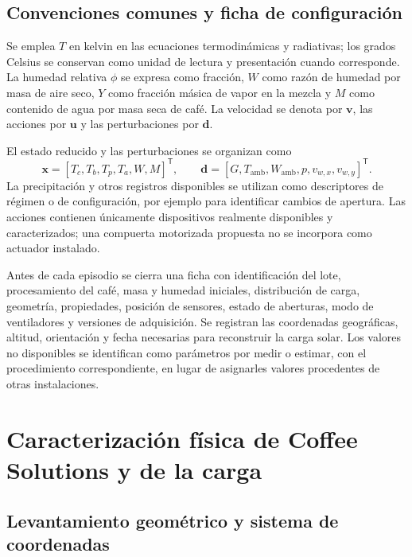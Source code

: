 \subsection{Convenciones comunes y ficha de configuración}

Se emplea $T$ en kelvin en las ecuaciones termodinámicas y radiativas; los grados Celsius se conservan como unidad de lectura y presentación cuando corresponde. La humedad relativa $\phi$ se expresa como fracción, $W$ como razón de humedad por masa de aire seco, $Y$ como fracción másica de vapor en la mezcla y $M$ como contenido de agua por masa seca de café. La velocidad se denota por $\mathbf v$, las acciones por $\mathbf u$ y las perturbaciones por $\mathbf d$.

El estado reducido y las perturbaciones se organizan como
\begin{equation}
\mathbf x=[T_c,T_b,T_p,T_a,W,M]^{\mathsf T},
\qquad
\mathbf d=[G,T_{\mathrm{amb}},W_{\mathrm{amb}},p,v_{w,x},v_{w,y}]^{\mathsf T}.
\label{met:estados_entradas}
\end{equation}
La precipitación y otros registros disponibles se utilizan como descriptores de régimen o de configuración, por ejemplo para identificar cambios de apertura. Las acciones contienen únicamente dispositivos realmente disponibles y caracterizados; una compuerta motorizada propuesta no se incorpora como actuador instalado.

Antes de cada episodio se cierra una ficha con identificación del lote, procesamiento del café, masa y humedad iniciales, distribución de carga, geometría, propiedades, posición de sensores, estado de aberturas, modo de ventiladores y versiones de adquisición. Se registran las coordenadas geográficas, altitud, orientación y fecha necesarias para reconstruir la carga solar. Los valores no disponibles se identifican como parámetros por medir o estimar, con el procedimiento correspondiente, en lugar de asignarles valores procedentes de otras instalaciones.

\section{Caracterización física de Coffee Solutions y de la carga}
\label{met:caracterizacion}

\subsection{Levantamiento geométrico y sistema de coordenadas}

